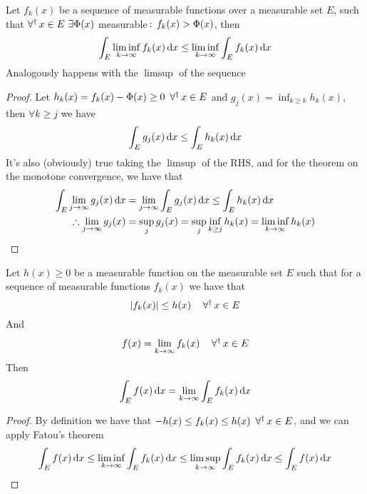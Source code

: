 \documentclass[../complete.tex]{subfiles}
\begin{document}
\begin{thm}[Fatou]
	Let $f_k(x)$ be a sequence of measurable functions over a measurable set $E$, such that $\foraall x\in E\ \exists\Phi(x)$ measurable$\, :\,  f_k(x)>\Phi(x)$, then
	\begin{equation*}
		\int_{E}^{}\liminf_{k\to\infty}f_k(x)\operatorname{d\!} x\le\liminf_{k\to\infty}\int_{E}^{}f_k(x)\operatorname{d\!} x
	\end{equation*}
	Analogously happens with the $\limsup$ of the sequence
\end{thm}
\begin{proof}
	Let $h_k(x)=f_k(x)-\Phi(x)\ge0\ \operatorname{\forall^\dagger} x\in E$ and $g_j(x)=\inf_{k\ge k}h_k(x)$, then $\forall k\ge j$ we have
	\begin{equation*}
		\int_{E}^{}g_j(x)\operatorname{d\!} x\le\int_{E}^{}h_k(x)\operatorname{d\!} x
	\end{equation*}
	It's also (obviously) true taking the $\limsup$ of the RHS, and for the theorem on the monotone convergence, we have that
	\begin{equation*}
		\begin{aligned}
			\int_{E}^{}\lim_{j\to\infty}g_j(x)\operatorname{d\!} x&=\lim_{j\to\infty}\int_{E}^{}g_j(x)\operatorname{d\!} x\le\int_{E}^{}h_k(x)\operatorname{d\!} x\\
			\therefore\lim_{j\to\infty}g_j(x)&= \sup_jg_j(x)=\sup_j\inf_{k\ge j}h_k(x)=\liminf_{k\to\infty}h_k(x)
		\end{aligned}
	\end{equation*}
\end{proof}
\begin{thm}
	Let $h(x)\ge0$ be a measurable function on the measurable set $E$ such that for a sequence of measurable functions $f_k(x)$ we have that
	\begin{equation*}
		\abs{f_k(x)}\le h(x)\quad\operatorname{\forall^\dagger} x\in E
	\end{equation*}
	And
	\begin{equation*}
		f(x)=\lim_{k\to\infty}f_k(x)\quad\operatorname{\forall^\dagger} x\in E
	\end{equation*}
	Then
	\begin{equation*}
		\int_{E}^{}f(x)\operatorname{d\!} x=\lim_{k\to\infty}\int_{E}^{}f_k(x)\operatorname{d\!} x
	\end{equation*}
	\label{thm:domcon}
\end{thm}
\begin{proof}
	By definition we have that $-h(x)\le f_k(x)\le h(x)\ \operatorname{\forall^\dagger} x\in E$, and we can apply Fatou's theorem
	\begin{equation*}
		\int_{E}^{}f(x)\operatorname{d\!} x\le\liminf_{k\to\infty}\int_{E}^{}f_k(x)\operatorname{d\!} x\le\limsup_{k\to\infty}\int_{E}^{}f_k(x)\operatorname{d\!} x\le\int_{E}^{}f(x)\operatorname{d\!} x
	\end{equation*}
\end{proof}
\end{document}
